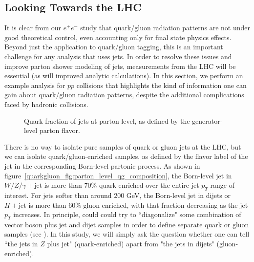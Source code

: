 \documentclass[11pt]{cernrep}
\begin{document}
\subsection{Looking Towards the LHC}
\label{quarkgluon_sec:pp}

It is clear from our $e^+e^-$ study that quark/gluon radiation patterns are not under good theoretical control, even accounting only for final state physics effects.  Beyond just the application to quark/gluon tagging, this is an important challenge for any analysis that uses jets.  In order to resolve these issues and improve parton shower modeling of jets, measurements from the LHC will be essential (as will improved analytic calculations).  In this section, we perform an example analysis for $pp$ collisions that highlights the kind of information one can gain about quark/gluon radiation patterns, despite the additional complications faced by hadronic collisions.

\begin{figure}
\centering
{}
\caption{Quark fraction of jets at parton level, as defined by the generator-level parton flavor.}
\label{fig:parton_level_qg_composition}
\end{figure}

There is no way to isolate pure samples of quark or gluon jets at the LHC, but we can isolate quark/gluon-enriched samples, as defined by the flavor label of the jet in the corresponding Born-level partonic process.  As shown in figure~\ref{quarkgluon_fig:parton_level_qg_composition}, the Born-level jet in $W/Z/\gamma + \text{jet}$ is more than 70\% quark enriched over the entire jet $p_T$ range of interest.  For jets softer than around 200 GeV, the Born-level jet in dijets or $H+\text{jet}$ is more than 60\% gluon enriched, with that fraction decreasing as the jet $p_T$ increases.  In principle, could could try to ``diagonalize" some combination of vector boson plus jet and dijet samples in order to define separate quark or gluon samples (see \cite{}).  In this study, we will simply ask the question whether one can tell ``the jets in $Z$ plus jet" (quark-enriched) apart from "the jets in dijets" (gluon-enriched).  
\end{document}
